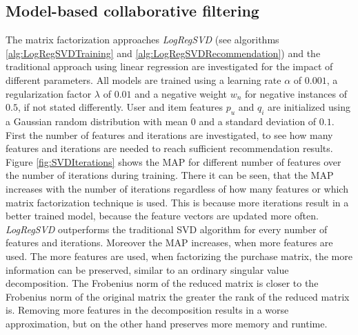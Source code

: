 \documentclass[10pt]{reportMaster}
\begin{document}
\subsection{Model-based collaborative filtering}
The matrix factorization approaches \textit{LogRegSVD} (see algorithms \ref{alg:LogRegSVDTraining} and \ref{alg:LogRegSVDRecommendation}) and the traditional approach using linear regression are investigated for the impact of different parameters.
All models are trained using a learning rate $\alpha$ of $0.001$, a regularization factor $\lambda$ of $0.01$ and a negative weight $w_n$ for negative instances of $0.5$, if not stated differently.
User and item features $p_u$ and $q_i$ are initialized using a Gaussian random distribution with mean 0 and a standard deviation of $0.1$.
First the number of features and iterations are investigated, to see how many features and iterations are needed to reach sufficient recommendation results.
Figure \ref{fig:SVDIterations} shows the MAP for different number of features over the number of iterations during training.
There it can be seen, that the MAP increases with the number of iterations regardless of how many features or which matrix factorization technique is used.
This is because more iterations result in a better trained model, because the feature vectors are updated more often.
\textit{LogRegSVD} outperforms the traditional SVD algorithm for every number of features and iterations.
Moreover the MAP increases, when more features are used.
The more features are used, when factorizing the purchase matrix, the more information can be preserved, similar to an ordinary singular value decomposition.
The Frobenius norm of the reduced matrix is closer to the Frobenius norm of the original matrix the greater the rank of the reduced matrix is.
Removing more features in the decomposition results in a worse approximation, but on the other hand preserves more memory and runtime.
\end{document}
